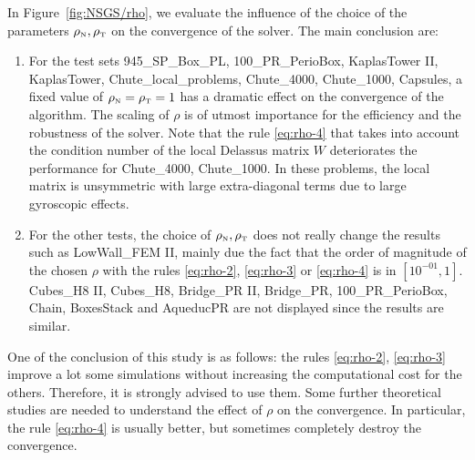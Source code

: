 In Figure~\ref{fig:NSGS/rho}, we evaluate the influence of the choice of the parameters $\rho_{\hbox{\tiny{N}}}, \rho_{\hbox{\tiny{T}}}$ on the convergence of the solver. The main conclusion are:
\begin{enumerate}
\item For the test sets 945\_SP\_Box\_PL, 100\_PR\_PerioBox, KaplasTower II, KaplasTower, Chute\_local\_problems, Chute\_4000, Chute\_1000, Capsules, a fixed value of $\rho_{\hbox{\tiny{N}}}=\rho_{\hbox{\tiny{T}}}=1$ has a dramatic effect on the convergence of the algorithm. The scaling of $\rho$ is of utmost importance for the efficiency and the robustness of the solver. Note that the rule  \eqref{eq:rho-4} that takes into account the condition number of the local Delassus matrix $W$ deteriorates the performance for  Chute\_4000, Chute\_1000. In these problems, the local matrix is unsymmetric with large extra-diagonal terms due to large gyroscopic effects.
  
\item For the other tests, the choice of $\rho_{\hbox{\tiny{N}}},\rho_{\hbox{\tiny{T}}}$ does not really change the results such as LowWall\_FEM II, mainly due the fact that the order of magnitude of the chosen $\rho$ with the rules \eqref{eq:rho-2}, \eqref{eq:rho-3} or \eqref{eq:rho-4} is in $[10^{-01}, 1]$. Cubes\_H8 II, Cubes\_H8, Bridge\_PR II, Bridge\_PR, 100\_PR\_PerioBox, Chain, BoxesStack and AqueducPR are not displayed since the results are similar.
\end{enumerate}
One of the conclusion of this study is as follows: the rules \eqref{eq:rho-2}, \eqref{eq:rho-3} improve a lot some simulations without increasing the computational cost for the others. Therefore, it is strongly advised to use them. Some further theoretical studies are needed to understand the effect of $\rho$ on the convergence. In particular, the rule \eqref{eq:rho-4} is usually better, but sometimes completely destroy the convergence.

